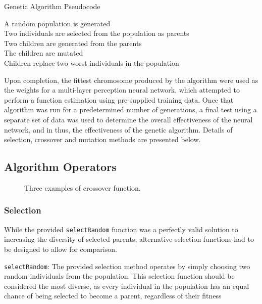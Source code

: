 		\begin{algorithm}[H]
			\caption{Genetic Algorithm Pseudocode}
			A random population is generated\\
			Two individuals are selected from the population as parents\\
			Two children are generated from  the parents\\
			The children are mutated\\
			Children replace two worst individuals in the population
		\end{algorithm}
		
		Upon completion, the fittest chromosome produced by the algorithm were used as the weights for a multi-layer perception neural network, which attempted to perform a function estimation using pre-supplied training data. Once that algorithm was run for a predetermined number of generations, a final test using a separate set of data was used to determine the overall effectiveness of the neural network, and in thus, the effectiveness of the genetic algorithm. Details of selection, crossover and mutation methods are presented below.  
			
	\subsection{Algorithm Operators}
	
	\begin{figure*}[]
		\centering
		\hfil
		\newline
		\caption{Three examples of crossover function.}
		\label{fig_cross}
	\end{figure*}
	
		\subsubsection{Selection}
			While the provided \texttt{selectRandom} function was a perfectly valid solution to increasing the diversity of selected parents, alternative selection functions had to be designed to allow for comparison.
			
			\texttt{selectRandom}: The provided selection method operates by simply choosing two random individuals from the population. This selection function should be considered the most diverse, as every individual in the population has an equal chance of being selected to become a parent, regardless of their fitness
	
